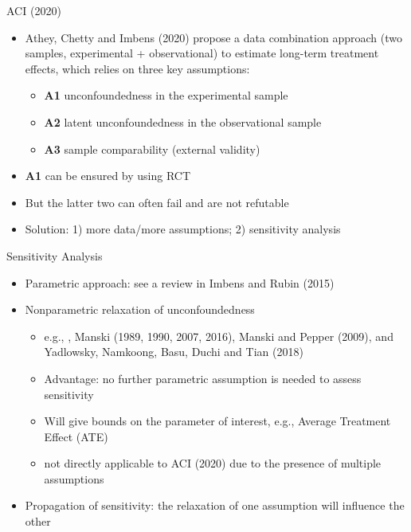 \documentclass{beamer}					%
\begin{document}
\begin{frame}{ACI (2020)}
    \begin{itemize}
        \item Athey, Chetty and Imbens (2020) propose a data combination approach (two samples, experimental + observational) to estimate long-term treatment effects, which relies on three key assumptions:
        \begin{itemize}
            \item {\color{green}\textbf{A1}} unconfoundedness in the experimental sample
            \item {\color{red}\textbf{A2}} latent unconfoundedness in the observational sample
            \item {\color{red}\textbf{A3}} sample comparability (external validity)
        \end{itemize}
        \item {\color{green}\textbf{A1}} can be ensured by using RCT
        \item But the latter two can often fail and are not refutable
        \item Solution: 1) more data/more assumptions; {\color{blue}2) sensitivity analysis}
    \end{itemize}
\end{frame}

\begin{frame}{Sensitivity Analysis}
    \begin{itemize}
        \item Parametric approach: see a review in Imbens and Rubin (2015)
        \item Nonparametric relaxation of unconfoundedness
        \begin{itemize}
            \item e.g., \textcite{rosenbaum2002overt}, Manski (1989, 1990, 2007, 2016), Manski and Pepper (2009), \textcite{masten2018identification} and Yadlowsky, Namkoong, Basu, Duchi and Tian (2018)
            \item Advantage: no further parametric assumption is needed to assess sensitivity
            \item Will give bounds on the parameter of interest, e.g., Average Treatment Effect (ATE)
            \item not directly applicable to ACI (2020) due to the presence of multiple assumptions
        \end{itemize}
        \item {\color{red}Propagation of sensitivity}: the relaxation of one assumption will influence the other
    \end{itemize}
\end{frame}
\end{document}
